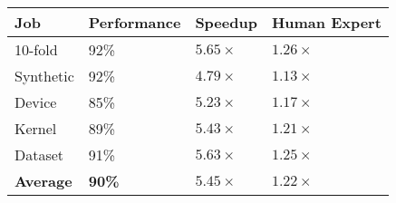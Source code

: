 \begin{tabular}{llll}
  \toprule
  Job & Performance & Speedup & Human Expert \\
  \midrule
  10-fold & 92\% &       $5.65\times$ &       $1.26\times$ \\
  Synthetic & 92\% &       $4.79\times$ &       $1.13\times$ \\
  Device & 85\% &       $5.23\times$ &       $1.17\times$ \\
  Kernel & 89\% &       $5.43\times$ &       $1.21\times$ \\
  Dataset & 91\% &       $5.63\times$ &       $1.25\times$ \\
  \textbf{Average} &  \textbf{90\%} &  $\bm{5.45\times}$ &  $\bm{1.22\times}$ \\
  \bottomrule
\end{tabular}

